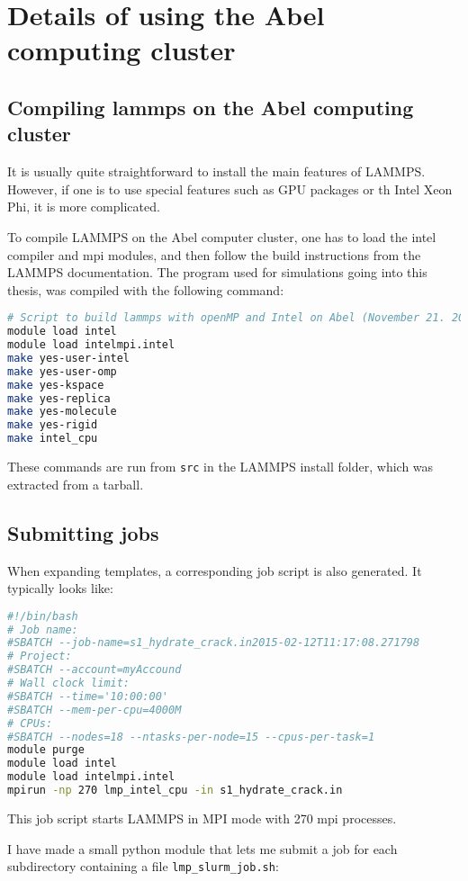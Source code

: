\chapter{Details of using the Abel computing cluster}

\section{Compiling lammps on the Abel computing cluster}
It is usually quite straightforward to install the main features of LAMMPS. However, if one is to use special features such as GPU packages or th Intel Xeon Phi, it is more complicated.

To compile LAMMPS on the Abel computer cluster, one has to load the intel compiler and mpi modules, and then follow the build instructions from the LAMMPS documentation. The program used for simulations going into this thesis, was compiled with the following command:
\begin{lstlisting}[language=Bash]
# Script to build lammps with openMP and Intel on Abel (November 21. 2014)
module load intel
module load intelmpi.intel
make yes-user-intel
make yes-user-omp
make yes-kspace
make yes-replica
make yes-molecule
make yes-rigid
make intel_cpu
\end{lstlisting}
These commands are run from {\tt src} in the LAMMPS install folder, which was extracted from a tarball.

\section{Submitting jobs}
When expanding templates, a corresponding job script is also generated. It typically looks like:
\begin{lstlisting}[language=Bash]
#!/bin/bash
# Job name:
#SBATCH --job-name=s1_hydrate_crack.in2015-02-12T11:17:08.271798
# Project: 
#SBATCH --account=myAccound
# Wall clock limit:
#SBATCH --time='10:00:00'
#SBATCH --mem-per-cpu=4000M
# CPUs:
#SBATCH --nodes=18 --ntasks-per-node=15 --cpus-per-task=1
module purge
module load intel
module load intelmpi.intel
mpirun -np 270 lmp_intel_cpu -in s1_hydrate_crack.in
\end{lstlisting}

This job script starts LAMMPS in MPI mode with 270 mpi processes.

I have made a small python module that lets me submit a job for each subdirectory containing a file {\tt lmp\_slurm\_job.sh}:

